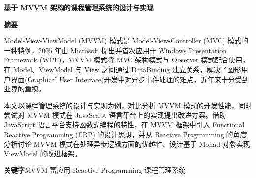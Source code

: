 \newpage
\begin{center}
	\heiti{}\textbf{基于 MVVM 架构的课程管理系统的设计与实现}
\end{center}
\begin{center}
	\heiti{}\textbf{摘\quad 要}
\end{center}
\vspace{2.5mm}
\songti{}

Model-View-ViewModel (MVVM) 模式是 Model-View-Controller (MVC) 模式的一种特例，2005 年由 Microsoft 提出并首次应用于 Windows Presentation Framework (WPF)，MVVM 模式将 MVC 架构模式与 Observer 模式配合使用，在 Model、ViewModel 与 View 之间通过 DataBinding 建立关系，解决了图形用户界面(Graphical User Interface)开发中对异步事件处理的难点，近年来十分受到业界的重视。

本文以课程管理系统的设计与实现为例，对比分析 MVVM 模式的开发性能，同时尝试对 MVVM 模式在 JavaScript 语言平台上的实现提出改进方案。借助 JavaScript 语言平台支持函数式编程的特性，在 MVVM 框架中引入 Functional Reactive Programming (FRP) 的设计思想，并从 Reactive Programming 的角度分析讨论 MVVM 模式在处理异步逻辑方面的优越性、设计基于 Monad 对象实现 ViewModel 的改进框架。

\vspace{3mm}
\heiti\textbf{关键字}\quad \songti MVVM \quad 富应用 \quad Reactive Programming \quad 课程管理系统

